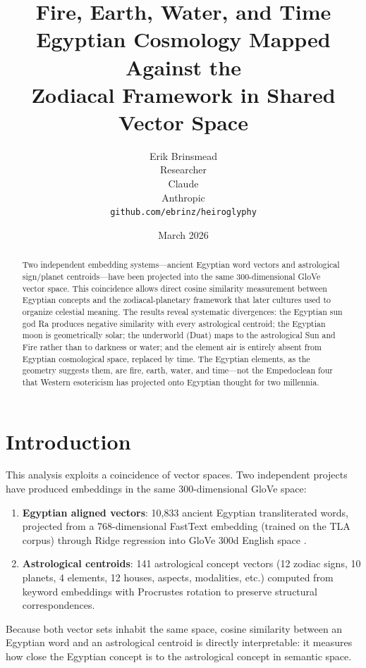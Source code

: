 \documentclass[11pt, a4paper]{article}
\title{
    \textbf{Fire, Earth, Water, and Time}\\[6pt]
    {\large Egyptian Cosmology Mapped Against the\\Zodiacal Framework in Shared Vector Space}
}
\author{
    Erik Brinsmead \\
    Researcher \\[6pt]
    Claude \\
    Anthropic \\[12pt]
    \texttt{github.com/ebrinz/heiroglyphy}
}
\date{March 2026}
\begin{document}
\maketitle

\begin{abstract}
Two independent embedding systems---ancient Egyptian word vectors and astrological sign/planet centroids---have been projected into the same 300-dimensional GloVe vector space. This coincidence allows direct cosine similarity measurement between Egyptian concepts and the zodiacal-planetary framework that later cultures used to organize celestial meaning. The results reveal systematic divergences: the Egyptian sun god Ra produces negative similarity with every astrological centroid; the Egyptian moon is geometrically solar; the underworld (Duat) maps to the astrological Sun and Fire rather than to darkness or water; and the element air is entirely absent from Egyptian cosmological space, replaced by time. The Egyptian elements, as the geometry suggests them, are fire, earth, water, and time---not the Empedoclean four that Western esotericism has projected onto Egyptian thought for two millennia.
\end{abstract}

\tableofcontents

\section{Introduction}

This analysis exploits a coincidence of vector spaces. Two independent projects have produced embeddings in the same 300-dimensional GloVe space:

\begin{enumerate}[nosep]
    \item \textbf{Egyptian aligned vectors}: 10,833 ancient Egyptian transliterated words, projected from a 768-dimensional FastText embedding (trained on the TLA corpus) through Ridge regression into GloVe 300d English space \citep{brinsmead2026geometry}.

    \item \textbf{Astrological centroids}: 141 astrological concept vectors (12 zodiac signs, 10 planets, 4 elements, 12 houses, aspects, modalities, etc.) computed from keyword embeddings with Procrustes rotation to preserve structural correspondences.
\end{enumerate}

Because both vector sets inhabit the same space, cosine similarity between an Egyptian word and an astrological centroid is directly interpretable: it measures how close the Egyptian concept is to the astrological concept in semantic space.
\end{document}
